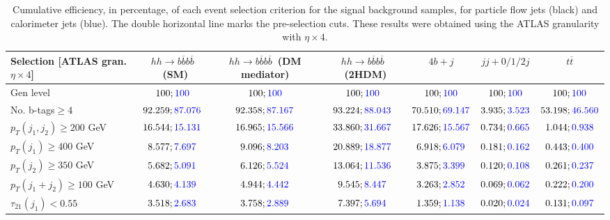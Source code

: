 \begin{landscape}
	\begin{table}
		\centering
		\caption{Cumulative efficiency, in percentage, of each event selection criterion for the signal background samples, for particle flow jets (black) and calorimeter jets (blue). The double horizontal line marks the pre-selection cuts. These results were obtained using the ATLAS granularity with $\eta\times 4$.}
		\begin{tabular}{lcccccc}
			\toprule 
			\textbf{Selection [ATLAS gran. $\eta\times 4$]} & $hh\rightarrow b\overline{b}b\overline{b}$~(SM) & $hh\rightarrow b\overline{b}b\overline{b}$~(DM mediator) & $hh\rightarrow b\overline{b}b\overline{b}$~(2HDM) & $4b+j$  & $jj+0/1/2 j$ & $t\overline{t}$ \\
			\midrule
			Gen level & $100;\textcolor{blue}{100}$ & $100;\textcolor{blue}{100}$ &$100;\textcolor{blue}{100}$& $100;\textcolor{blue}{100}$& $100;\textcolor{blue}{100}$& $100;\textcolor{blue}{100}$ \\
			\rowcolor{black!7}No. b-tags$\geq 4$&$92.259;\textcolor{blue}{87.076}$&$92.358;\textcolor{blue}{87.167}$&$93.224;\textcolor{blue}{88.043}$&$70.510;\textcolor{blue}{69.147}$&$3.935;\textcolor{blue}{3.523}$&$53.198;\textcolor{blue}{46.560}$\\
			$p_T(j_1,j_2)\geq200$ GeV & $16.544;\textcolor{blue}{15.131}$ & $16.965;\textcolor{blue}{15.566}$&$33.860;\textcolor{blue}{31.667}$ &$17.626;\textcolor{blue}{15.567}$&$0.734;\textcolor{blue}{0.665}$&$1.044;\textcolor{blue}{0.938}$\\
			\midrule \midrule
			\rowcolor{black!7}$p_T(j_1)\geq 400$ GeV & $8.577;\textcolor{blue}{7.697}$ &$9.096;\textcolor{blue}{8.203}$  &$20.889;\textcolor{blue}{18.877}$&$6.918;\textcolor{blue}{6.079}$&$0.181;\textcolor{blue}{0.162}$&$0.443;\textcolor{blue}{0.400}$\\ 
			$p_T(j_2)\geq 350$ GeV & $5.682;\textcolor{blue}{5.091}$& $6.126;\textcolor{blue}{5.524}$&$13.064;\textcolor{blue}{11.536}$&$3.875;\textcolor{blue}{3.399}$&$0.120;\textcolor{blue}{0.108}$&$0.261;\textcolor{blue}{0.237}$\\
			\rowcolor{black!7}$p_T(j_1+j_2)\geq 100$ GeV &$4.630;\textcolor{blue}{4.139}$ & $4.944;\textcolor{blue}{4.442}$ &$9.545;\textcolor{blue}{8.447}$&$3.263;\textcolor{blue}{2.852}$&$0.069;\textcolor{blue}{0.062}$&$0.222;\textcolor{blue}{0.200}$\\
			$\tau_{21}(j_1)<0.55$ & $3.518;\textcolor{blue}{2.683}$& $3.758;\textcolor{blue}{2.889}$&$7.397;\textcolor{blue}{5.694}$&$1.359;\textcolor{blue}{1.138}$&$0.020;\textcolor{blue}{0.024}$&$0.131;\textcolor{blue}{0.097}$\\

\end{tabular}
\end{table}
\end{landscape}
